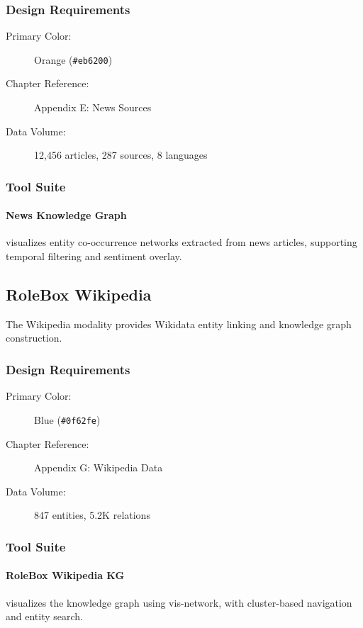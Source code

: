 \subsubsection{Design Requirements}

\begin{description}
    \item[Primary Color:] Orange (\texttt{\#eb6200})
    \item[Chapter Reference:] Appendix E: News Sources
    \item[Data Volume:] 12,456 articles, 287 sources, 8 languages
\end{description}

\subsubsection{Tool Suite}

\paragraph{News Knowledge Graph} visualizes entity co-occurrence networks extracted from news articles, supporting temporal filtering and sentiment overlay.

\subsection{RoleBox Wikipedia}

The Wikipedia modality provides Wikidata entity linking and knowledge graph construction.

\subsubsection{Design Requirements}

\begin{description}
    \item[Primary Color:] Blue (\texttt{\#0f62fe})
    \item[Chapter Reference:] Appendix G: Wikipedia Data
    \item[Data Volume:] 847 entities, 5.2K relations
\end{description}

\subsubsection{Tool Suite}

\paragraph{RoleBox Wikipedia KG} visualizes the knowledge graph using vis-network, with cluster-based navigation and entity search.

